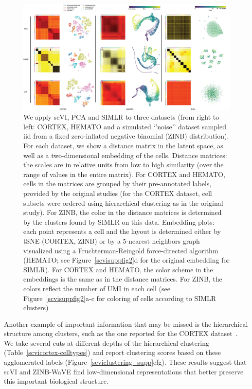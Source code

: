 \begin{figure}
\includegraphics[width=\textwidth]{figures/Figure-2}
\centering
\caption[Clustering panel for scVI, PCA and SIMLR]{We apply scVI, PCA and SIMLR to three datasets (from right to left: CORTEX, HEMATO and a simulated `'noise'' dataset sampled iid from a fixed zero-inflated negative binomial (ZINB) distribution). For each dataset, we show a distance matrix in the latent space, as well as a two-dimensional embedding of the cells. Distance matrices: the scales are in relative units from low to high similarity (over the range of values in the entire matrix). For CORTEX and HEMATO, cells in the matrices are grouped by their pre-annotated labels, provided by the original studies (for the CORTEX dataset, cell subsets were ordered using hierarchical clustering as in the original study). For ZINB, the color in the distance matrices is determined by the clusters found by SIMLR on this data.  Embedding plots: each point represents a cell and the layout is determined either by tSNE (CORTEX, ZINB) or by a 5-nearest neighbors graph visualized using a Fruchterman-Reingold force-directed algorithm (HEMATO; see Figure~\ref{scvisuppfig2}d for the original embedding for SIMLR). For CORTEX and HEMATO, the color scheme in the embeddings is the same as in the distance matrices. For ZINB, the colors reflect the number of UMI in each cell (see Figure~\ref{scvisuppfig2}a-c for coloring of cells according to SIMLR clusters)}
\label{scviclustering_panel}
\end{figure}


Another example of important information that may be missed is the hierarchical structure among clusters, such as the one reported for the CORTEX dataset~\cite{Zeisel1138}. We take several cuts at different depths of the hierarchical clustering (Table~\ref{scvicortex-celltypes}) and report clustering scores based on these agglomerated labels (Figure~\ref{scviclustering_supp}efg). These results suggest that scVI and ZINB-WaVE find low-dimensional representations that better preserve this important biological structure.


